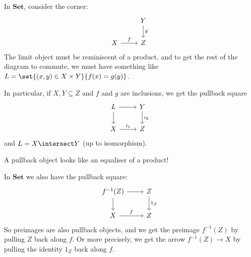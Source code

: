 \documentclass[article, a4paper, 11pt, oneside]{memoir}
\numberwithin{equation}{chapter}
\newcommand{\ncat}[1]{\mathbf{#1}} %
\newcommand{\catSet}{\ncat{Set}}
\begin{document}
\begin{examplebreak}
    \begin{enumexample}
        \item In $\catSet$, consider the corner:
        \begin{equation*}
            \begin{tikzcd}
                & Y
                    \ar[d, "g"]
                \\
                X
                    \ar[r, "f"]
                & Z
            \end{tikzcd}
        \end{equation*}
        The limit object must be reminiscent of a product, and to get the rest of the diagram to commute, we must have something like $L = \set{(x,y) \in X \times Y}{f(x) = g(y)}$.

        In particular, if $X, Y \subseteq Z$ and $f$ and $g$ are inclusions, we get the pullback square
        \begin{equation*}
            \begin{tikzcd}
                L
                    \ar[r]
                    \ar[d]
                & Y
                    \ar[d, "i_2"]
                \\
                X
                    \ar[r, "i_1"]
                & Z
            \end{tikzcd}
        \end{equation*}
        and $L = X \intersect Y$ (up to isomorphism).

        A pullback object looks like an equaliser of a product!

        \item In $\catSet$ we also have the pullback square:
        \begin{equation*}
            \begin{tikzcd}
                f^{-1}(Z)
                    \ar[r]
                    \ar[d]
                & Z
                    \ar[d, "1_Z"]
                \\
                X
                    \ar[r, "f"]
                & Z
            \end{tikzcd}
        \end{equation*}
        So preimages are also pullback objects, and we get the preimage $f^{-1}(Z)$ by pulling $Z$ back along $f$. Or more precisely, we get the arrow $f^{-1}(Z) \to X$ by pulling the identity $1_Z$ back along $f$.
    \end{enumexample}
\end{examplebreak}
\end{document}
